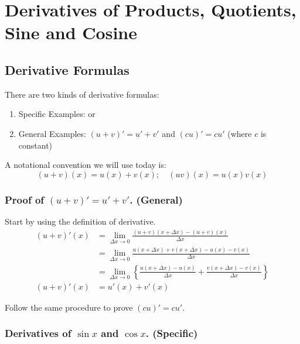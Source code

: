 

\chapter{Derivatives of Products, Quotients, Sine and Cosine}

\bigbreak
\section{Derivative Formulas}

There are two kinds of derivative formulas:

\begin{enumerate}
\item Specific Examples:  or 
\item General Examples: $(u+v)' = u' + v'$ and $(cu)' = cu'$ (where $c$ is constant)
\end{enumerate}

A notational convention we will use today is:
$$(u+v)(x) = u(x) + v(x); \quad (uv)(x) = u(x)v(x)$$

\subsection{Proof of $(u+v)' = u'+v'$. (General)}

Start by using the definition of derivative.
\begin{align*}
	(u+v)'(x)	& = \lim_{\Delta x \to 0} \frac{(u+v)(x+\Delta x) - (u+v)(x)}{\Delta x} \\
				& = \lim_{\Delta x \to 0} \frac{u(x+\Delta x)+v(x+\Delta x) - u(x) - v(x)}{\Delta x} \\
				& = \lim_{\Delta x \to 0} \left\{ \frac{u(x+\Delta x) - u(x)}{\Delta x} + \frac{v(x+\Delta x) - v(x)}{\Delta x} \right\} \\
	(u+v)'(x)	& = u'(x) + v'(x)
\end{align*}

Follow the same procedure to prove $(cu)' = cu'$.

\subsection{Derivatives of $\sin x$ and $\cos x$. (Specific)}

